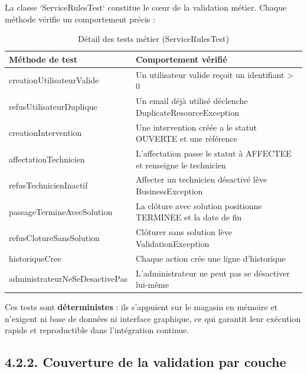 \documentclass[11pt,a4paper]{report}
\begin{document}
La classe `ServiceRulesTest` constitue le cœur de la validation métier. Chaque méthode vérifie un comportement précis :
\begin{table}[htbp]\centering\small
\begin{tabularx}{\textwidth}{|p{3.8cm}|X|}
\hline\rowcolor{hdr}\textbf{Méthode de test} & \textbf{Comportement vérifié}\\ \hline
creationUtilisateurValide & Un utilisateur valide reçoit un identifiant > 0\\ \hline
refusUtilisateurDuplique & Un email déjà utilisé déclenche DuplicateResourceException\\ \hline
creationIntervention & Une intervention créée a le statut OUVERTE et une référence\\ \hline
affectationTechnicien & L'affectation passe le statut à AFFECTEE et renseigne le technicien\\ \hline
refusTechnicienInactif & Affecter un technicien désactivé lève BusinessException\\ \hline
passageTermineAvecSolution & La clôture avec solution positionne TERMINEE et la date de fin\\ \hline
refusClotureSansSolution & Clôturer sans solution lève ValidationException\\ \hline
historiqueCree & Chaque action crée une ligne d'historique\\ \hline
administrateurNeSeDesactivePas & L'administrateur ne peut pas se désactiver lui-même\\ \hline
\end{tabularx}
\caption{Détail des tests métier (ServiceRulesTest)}
\end{table}

Ces tests sont \textbf{déterministes} : ils s'appuient sur le magasin en mémoire et n'exigent ni base de données ni interface graphique, ce qui garantit leur exécution rapide et reproductible dans l'intégration continue.
\subsection*{4.2.2. Couverture de la validation par couche}
\end{document}
